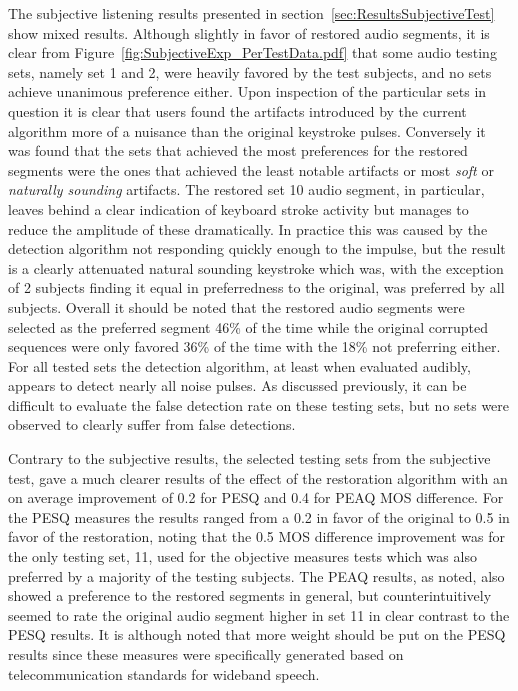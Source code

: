 The subjective listening results presented in section~\ref{sec:ResultsSubjectiveTest} show mixed results. Although slightly in favor of restored audio segments, it is clear from Figure~\ref{fig:SubjectiveExp_PerTestData.pdf} that some audio testing sets, namely set 1 and 2, were heavily favored by the test subjects, and no sets achieve unanimous preference either. Upon inspection of the particular sets in question it is clear that users found the artifacts introduced by the current algorithm more of a nuisance than the original keystroke pulses. Conversely it was found that the sets that achieved the most preferences for the restored segments were the ones that achieved the least notable artifacts or most \emph{soft} or \emph{naturally sounding} artifacts. The restored set 10 audio segment, in particular, leaves behind a clear indication of keyboard stroke activity but manages to reduce the amplitude of these dramatically. In practice this was caused by the detection algorithm not responding quickly enough to the impulse, but the result is a clearly attenuated natural sounding keystroke which was, with the exception of 2 subjects finding it equal in preferredness to the original, was preferred by all subjects. Overall it should be noted that the restored audio segments were selected as the preferred segment 46\% of the time while the original corrupted sequences were only favored 36\% of the time with the 18\% not preferring either. For all tested sets the detection algorithm, at least when evaluated audibly, appears to detect nearly all noise pulses. As discussed previously, it can be difficult to evaluate the false detection rate on these testing sets, but no sets were observed to clearly suffer from false detections.


Contrary to the subjective results, the selected testing sets from the subjective test, gave a much clearer results of the effect of the restoration algorithm with an on average improvement of 0.2 for PESQ and 0.4 for PEAQ MOS difference. For the PESQ measures the results ranged from a 0.2 in favor of the original to 0.5 in favor of the restoration, noting that the 0.5 MOS difference improvement was for the only testing set, 11, used for the objective measures tests which was also preferred by a majority of the testing subjects. The PEAQ results, as noted, also showed a preference to the restored segments in general, but counterintuitively seemed to rate the original audio segment higher in set 11 in clear contrast to the PESQ results. It is although noted that more weight should be put on the PESQ results since these measures were specifically generated based on telecommunication standards for wideband speech.

